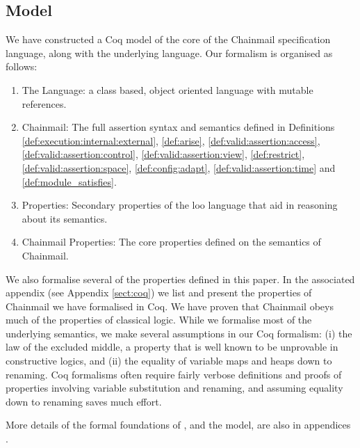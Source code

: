 \subsection{Model}


We have constructed a Coq model \cite{coq} of the core of the Chainmail
specification language, along with the underlying \LangOO language.
Our formalism is organised as follows:
\begin{enumerate}
\item
The \LangOO Language: a class based, object oriented language with mutable references.
\item
Chainmail: The full assertion syntax and semantics defined in Definitions \ref{def:execution:internal:external}, \ref{def:arise}, \ref{def:valid:assertion:access}, \ref{def:valid:assertion:control}, \ref{def:valid:assertion:view}, \ref{def:restrict}, \ref{def:valid:assertion:space}, \ref{def:config:adapt}, \ref{def:valid:assertion:time} and \ref{def:module_satisfies}.
\item
\LangOO Properties: Secondary properties of the loo language that aid in reasoning about its semantics.
\item
Chainmail Properties: The core properties defined on the semantics of Chainmail.
\end{enumerate}

We also formalise several of the properties defined in this paper. In the associated appendix (see Appendix \ref{sect:coq}) we list and present the properties of Chainmail we have formalised in Coq.
We have proven that Chainmail obeys much of the properties of classical logic. While we formalise most of the underlying semantics, we make several assumptions in our Coq formalism: (i) the law of the excluded middle,  a property that is well known to be unprovable in constructive logics, and (ii) the equality of variable maps and heaps down to renaming. Coq formalisms often require fairly verbose definitions and proofs of properties involving variable substitution and renaming, and assuming equality down to renaming saves much effort.

More details of the formal foundations of \Chainmail, and the model,
are also in appendices \cite{examples}.

